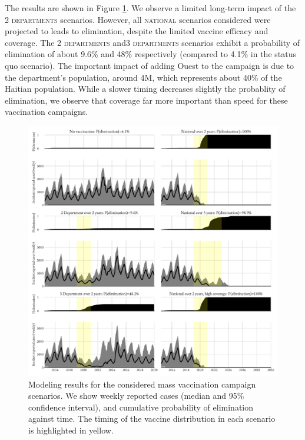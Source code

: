 The results are shown in Figure \ref{fig:OCVresults}. We observe a limited long-term impact of the \textsc{2 departments} scenarios. However, all \textsc{national} scenarios considered were projected to leads to elimination, despite the limited vaccine efficacy and coverage. The \textsc{2 departments} and\textsc{3 departments} scenarios exhibit a probability of elimination of about 9.6\% and 48\% respectively (compared to 4.1\% in the status quo scenario). The important impact of adding Ouest to the campaign is due to the department's population, around 4M, which represents about 40\% of the Haitian population. While a slower timing decreases slightly the probablity of elimination, we observe that coverage far more important than speed for these vaccination campaigns.

\begin{figure}[h!]%
\begin{center}
\includegraphics{fig_cholera-haiti-ocv/haiti-scn.pdf}
\caption[Cholera in Haiti after mass vaccination campaigns]{Modeling results for the considered mass vaccination campaign scenarios. We show weekly reported cases (median and 95\% confidence interval), and cumulative probability of elimination against time. The timing of the vaccine distribution in each scenario is highlighted in yellow.}
\label{fig:OCVresults}
\end{center}
\end{figure}
 
